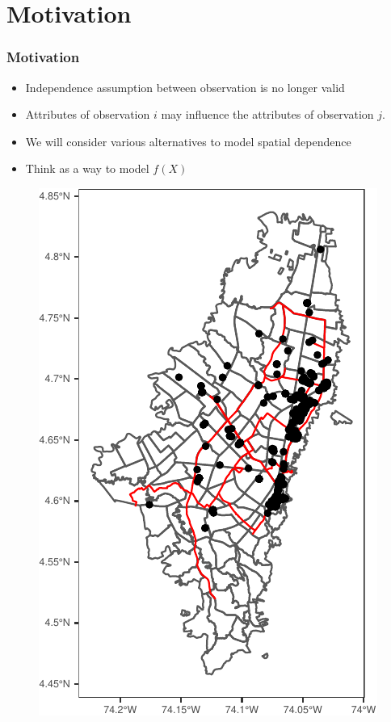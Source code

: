 \documentclass[
  shownotes,
  xcolor={svgnames},
  hyperref={colorlinks,citecolor=DarkBlue,linkcolor=DarkRed,urlcolor=DarkBlue}
  ]{beamer}
\begin{document}
\section{Motivation }
\begin{frame}[fragile]
\frametitle{Motivation}


\begin{minipage}[t]{0.52\linewidth}
\bigskip
\begin{itemize}
  
  \item Independence assumption between observation is no longer valid
  \medskip
  \item Attributes of observation $i$  may influence the attributes of observation $j$.
  \medskip
  \item We will consider various alternatives to model spatial dependence
  \medskip
  \item Think as a way to model $f(X)$
\end{itemize}

    \end{minipage}
    \hfill
    \begin{minipage}[t]{0.43\linewidth}%
       \medskip
        \begin{figure}[H] \centering
            \captionsetup{justification=centering}
\includegraphics[scale=0.6]{figures/restaurants_bogota.pdf}

 \end{figure}
    \end{minipage}

\end{frame}
\end{document}
